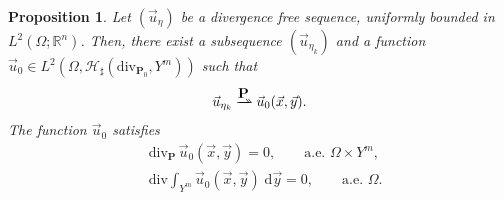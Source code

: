 \documentclass[a4paper,reqno]{amsart}
\numberwithin{equation}{section}
\numberwithin{equation}{section}		%
\numberwithin{figure}{section}			%
\numberwithin{table}{section}				%
\newcommand{\R}{\mathbb{R}}
\newtheorem{proposition}[theorem]{Proposition}
\theoremstyle{definition}
\newcommand{\<}{\ensuremath \leq}
\renewcommand{\>}{\ensuremath \geq}
\def\e{\eta}
\def\wdto{\buildrel\hbox{$\textbf{P}$}\over
\rightharpoonup \!\!\!\!\! \rightharpoonup}
\def\O{\Omega}
\begin{document}
\begin{proposition}
\label{prop:eta_div_free}
Let  $(\vec{u}_\e)$  be a divergence free sequence, uniformly bounded in $L^2(\Omega;\R^n)$. Then, there exist a subsequence $(\vec{u}_{\e_k})$
and a function {$\vec{u}_0\in  L^2(\O,{\mathcal H}_{\sharp}(\mathrm{div}_{\textbf{P}_0},Y^m))$}
such that
\begin{equation*}
\vec{u}_{\e_k} \wdto \vec{u}_0(\vec{x},\vec{y}).
\end{equation*}
The function $\vec{u}_0$ satisfies
\begin{equation}
\label{eq:div_R_free_limit}
         \begin{aligned}
& \mathrm{div}_\textbf{P}\, \vec{u}_0(\vec{x},\vec{y}) = 0, \qquad \mbox{a.e. } \Omega\times Y^m,  \\
& \mathrm{div} \int_{Y^m} \vec{u}_0(\vec{x},\vec{y}) \; \mathrm{d}\vec{y} = 0,  \qquad \mbox{a.e. } \Omega.
         \end{aligned}
\end{equation}
\end{proposition}


\iffalse
\end{document}
